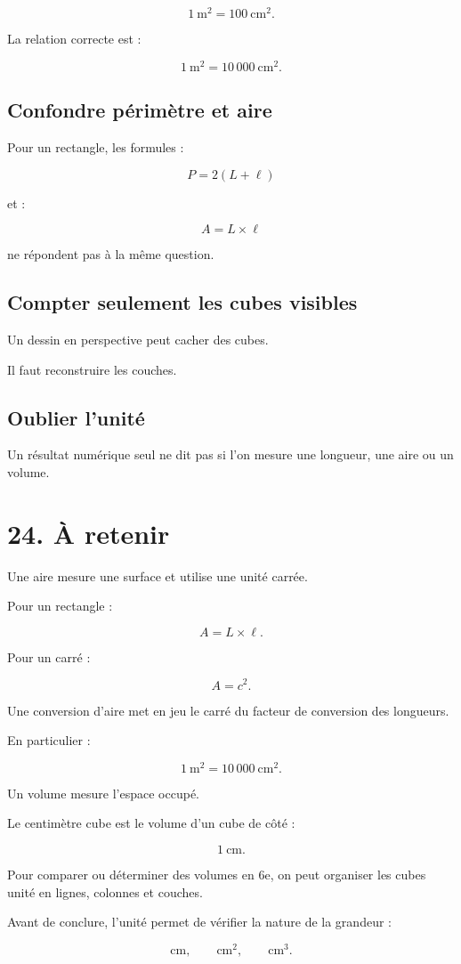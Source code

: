 \[
1\ \text{m}^2=100\ \text{cm}^2.
\]

La relation correcte est :

\[
1\ \text{m}^2=10\,000\ \text{cm}^2.
\]

\subsection{Confondre périmètre et aire}

Pour un rectangle, les formules :

\[
P=2(L+\ell)
\]

et :

\[
A=L\times\ell
\]

ne répondent pas à la même question.

\subsection{Compter seulement les cubes visibles}

Un dessin en perspective peut cacher des cubes.

Il faut reconstruire les couches.

\subsection{Oublier l’unité}

Un résultat numérique seul ne dit pas si l’on mesure une longueur, une aire ou un volume.

\section{24. À retenir}

Une aire mesure une surface et utilise une unité carrée.

Pour un rectangle :

\[
\boxed{A=L\times\ell}.
\]

Pour un carré :

\[
\boxed{A=c^2}.
\]

Une conversion d’aire met en jeu le carré du facteur de conversion des longueurs.

En particulier :

\[
\boxed{1\ \text{m}^2=10\,000\ \text{cm}^2}.
\]

Un volume mesure l’espace occupé.

Le centimètre cube est le volume d’un cube de côté :

\[
1\ \text{cm}.
\]

Pour comparer ou déterminer des volumes en 6e, on peut organiser les cubes unité en lignes, colonnes et couches.

Avant de conclure, l’unité permet de vérifier la nature de la grandeur :

\[
\text{cm},\qquad \text{cm}^2,\qquad \text{cm}^3.
\]

